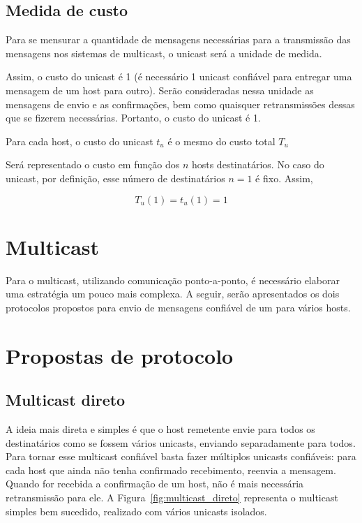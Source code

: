 \documentclass[12pt,twocolumn]{article}
\begin{document}
			\subsection{Medida de custo}
				Para se mensurar a quantidade de mensagens necessárias para a transmissão das mensagens nos sistemas de multicast, o unicast será a unidade de medida.
				
				Assim, o custo do unicast é 1 (é necessário 1 unicast confiável para entregar uma mensagem de um host para outro).
				Serão consideradas nessa unidade as mensagens de envio e as confirmações, bem como quaisquer retransmissões dessas que se fizerem necessárias.
				Portanto, o custo do unicast é 1.
				
				Para cada host, o custo do unicast $t_u$ é o mesmo do custo total $T_u$
				
				Será representado o custo em função dos $n$ hosts destinatários.
				No caso do unicast, por definição, esse número de destinatários $n = 1$ é fixo.
				Assim, 
				
				\begin{equation} \label{eq:unicast}					
					T_u(1) = t_u(1) = 1 					
				\end{equation}
			
				
		
		\section{Multicast}
		
			Para o multicast, utilizando comunicação ponto-a-ponto, é necessário elaborar uma estratégia um pouco mais complexa.
			A seguir, serão apresentados os dois protocolos propostos para envio de mensagens confiável de um para vários hosts.
		
		\section*{Propostas de protocolo}	
		
			\subsection{Multicast direto}
				A ideia mais direta e simples é que o host remetente envie para todos os destinatários como se fossem vários unicasts, enviando separadamente para todos.
				Para tornar esse multicast confiável basta fazer múltiplos unicasts confiáveis: para cada host que ainda não tenha confirmado recebimento, reenvia a mensagem.
				Quando for recebida a confirmação de um host, não é mais necessária retransmissão para ele. 
				A Figura~\ref{fig:multicast_direto} representa o multicast simples bem sucedido, realizado com vários unicasts isolados. 
			
\end{document}
